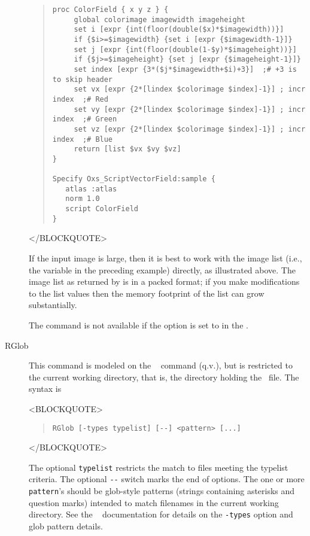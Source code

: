 \begin{description}
\begin{quote}
\begin{verbatim}
proc ColorField { x y z } {
     global colorimage imagewidth imageheight
     set i [expr {int(floor(double($x)*$imagewidth))}]
     if {$i>=$imagewidth} {set i [expr {$imagewidth-1}]}
     set j [expr {int(floor(double(1-$y)*$imageheight))}]
     if {$j>=$imageheight} {set j [expr {$imageheight-1}]}
     set index [expr {3*($j*$imagewidth+$i)+3}]  ;# +3 is to skip header
     set vx [expr {2*[lindex $colorimage $index]-1}] ; incr index  ;# Red
     set vy [expr {2*[lindex $colorimage $index]-1}] ; incr index  ;# Green
     set vz [expr {2*[lindex $colorimage $index]-1}] ; incr index  ;# Blue
     return [list $vx $vy $vz]
}

Specify Oxs_ScriptVectorField:sample {
   atlas :atlas
   norm 1.0
   script ColorField
}
\end{verbatim}
\end{quote}
\begin{rawhtml}
</BLOCKQUOTE>
\end{rawhtml}
If the input image is large, then it is best to work with the image list
(i.e., the variable  in the preceding example) directly,
as illustrated above.  The image list as returned by  is in
a packed format; if you make modifications to the list values then the
memory footprint of the list can grow substantially.

The  command is not available if the 
option is set to  in the 
.

\item[RGlob\label{html:mif2rglob}]
This command is modeled on the \Tcl\  command (q.v.), but
is restricted to the current working directory, that is, the
directory holding the \MIF\ file.  The syntax is
\begin{rawhtml}
<BLOCKQUOTE>
\end{rawhtml}
\begin{quote}
\begin{verbatim}
RGlob [-types typelist] [--] <pattern> [...]
\end{verbatim}
\end{quote}
\begin{rawhtml}
</BLOCKQUOTE>
\end{rawhtml}
The optional \texttt{typelist} restricts the match to files meeting the
typelist criteria.  The optional \verb+--+ switch marks the end of
options.  The one or more \texttt{pattern}'s should be glob-style
patterns (strings containing asterisks and question marks) intended to
match filenames in the current working directory.  See the \Tcl\
 documentation for details on the \texttt{-types} option and
glob pattern details.


\end{description}

